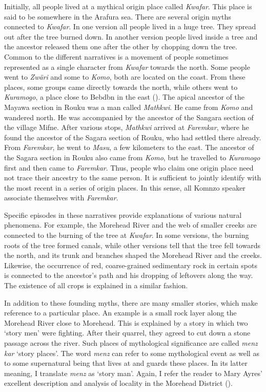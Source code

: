Initially, all people lived at a mythical origin place called \emph{Kwafar}. This place is said to be somewhere in the Arafura sea. There are several origin myths connected to \emph{Kwafar}. In one version all people lived in a huge tree. They spread out after the tree burned down. In another version people lived inside a tree and the ancestor released them one after the other by chopping down the tree. Common to the different narratives is a movement of people {\textendash} sometimes represented as a single character {\textendash} from \emph{Kwafar} towards the north. Some people went to \emph{Zwäri} and some to \emph{Komo}, both are located on the coast. From these places, some groups came directly towards the north, while others went to \emph{Kuramogo}, a place close to Bebdbn in the east (\citealt[292]{Williams:1936transfly}). The apical ancestor of the Mayawa section in Rouku was a man called \emph{Mathkwi}. He came from \emph{Komo} and wandered north. He was accompanied by the ancestor of the Sangara section of the village Mifne. After various stops, \emph{Mathkwi} arrived at \emph{Faremkar}, where he found the ancestor of the Sagara section of Rouku, who had settled there already. From \emph{Faremkar}, he went to \emph{Masu}, a few kilometers to the east. The ancestor of the Sagara section in Rouku also came from \emph{Komo}, but he travelled to \emph{Kuramogo} first and then came to \emph{Faremkar}. Thus, people who claim one origin place need not trace their ancestry to the same person. It is sufficient to jointly identify with the most recent in a series of origin places. In this sense, all Komnzo speaker associate themselves with \emph{Faremkar}.%

Specific episodes in these narratives provide explanations of various natural phenomena. For example, the Morehead River and the web of smaller creeks are connected to the burning of the tree at \emph{Kwafar}. In some versions, the burning roots of the tree formed canals, while other versions tell that the tree fell towards the north, and its trunk and branches shaped the Morehead River and the creeks. Likewise, the occurrence of red, coarse-grained sedimentary rock in certain spots is connected to the ancestor's path and his dropping of leftovers along the way. The existence of all crops is explained in a similar fashion.%

In addition to these founding myths, there are many smaller stories, which make reference to a particular place. An example is a small rock layer along the Morehead River close to Morehead. This is explained by a story in which two `story men' were fighting. After their quarrel, they agreed to cut down a stone passage across the river. Such places of mythological significance are called \emph{menz kar} `story places'. The word \emph{menz} can refer to some mythological event as well as to some supernatural being that lives at and guards these places. In its latter meaning, I translate \emph{menz} as `story man'. Again, I refer the reader to Mary Ayres' excellent description and analysis of locality in the Morehead District (\citealt{Ayres:ws}).

